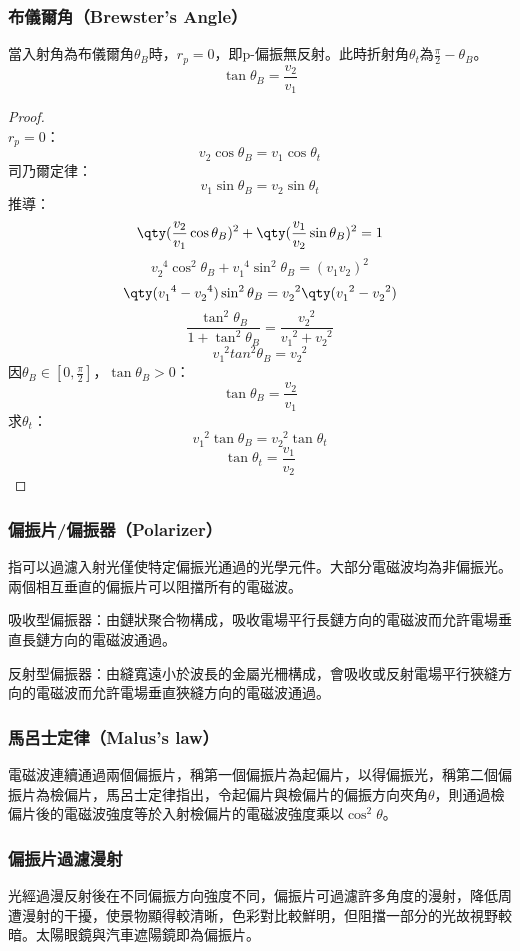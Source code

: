 \documentclass[a4paper,12pt]{report}
\begin{document}
\subsubsection{布儀爾角（Brewster's Angle）}
當入射角為布儀爾角$\theta_B$時，$r_p=0$，即p-偏振無反射。此時折射角$\theta_t$為$\frac{\pi}{2}-\theta_B$。
\[ \tan \theta_B = \frac{v_2}{v_1} \]
\begin{proof}\mbox{}\\
$r_p=0$：
\[ v_2\cos\theta_B=v_1\cos\theta_t \]
司乃爾定律：
\[ v_1\sin\theta_B=v_2\sin\theta_t \]
推導：
\[\qty(\frac{v_2}{v_1}\cos\theta_B)^2+\qty(\frac{v_1}{v_2}\sin\theta_B)^2=1\]
\[v_2^{\phantom{2}4}\cos^2\theta_B+v_1^{\phantom{1}4}\sin^2\theta_B=(v_1v_2)^2\]
\[\qty(v_1^{\phantom{1}4}-v_2^{\phantom{2}4})\sin^2\theta_B =v_2^{\phantom{2}2}\qty(v_1^{\phantom{1}2}-v_2^{\phantom{2}2})\]
\[\frac{\tan^2\theta_B }{1+\tan^2\theta_B }=\frac{v_2^{\phantom{2}2}}{v_1^{\phantom{1}2}+v_2^{\phantom{2}2}}\]
\[v_1^{\phantom{1}2}tan^2\theta_B =v_2^{\phantom{2}2}\]
因$\theta_B\in [0,\frac{\pi}{2}]$，$\tan\theta_B >0$：
\[ \tan \theta_B = \frac{v_2}{v_1} \]
求$\theta_t$：
\[ v_1^{\phantom{1}2}\tan\theta_B=v_2^{\phantom{2}2}\tan\theta_t \]
\[ \tan \theta_t = \frac{v_1}{v_2} \]
\end{proof}
\subsubsection{偏振片/偏振器（Polarizer）}
指可以過濾入射光僅使特定偏振光通過的光學元件。大部分電磁波均為非偏振光。兩個相互垂直的偏振片可以阻擋所有的電磁波。
\bit
\item 吸收型偏振器：由鏈狀聚合物構成，吸收電場平行長鏈方向的電磁波而允許電場垂直長鏈方向的電磁波通過。
\item 反射型偏振器：由縫寬遠小於波長的金屬光柵構成，會吸收或反射電場平行狹縫方向的電磁波而允許電場垂直狹縫方向的電磁波通過。
\eit
\subsubsection{馬呂士定律（Malus's law）}
電磁波連續通過兩個偏振片，稱第一個偏振片為起偏片，以得偏振光，稱第二個偏振片為檢偏片，馬呂士定律指出，令起偏片與檢偏片的偏振方向夾角$\theta$，則通過檢偏片後的電磁波強度等於入射檢偏片的電磁波強度乘以$\cos^2\theta$。
\subsubsection{偏振片過濾漫射}
光經過漫反射後在不同偏振方向強度不同，偏振片可過濾許多角度的漫射，降低周遭漫射的干擾，使景物顯得較清晰，色彩對比較鮮明，但阻擋一部分的光故視野較暗。太陽眼鏡與汽車遮陽鏡即為偏振片。
\end{document}
